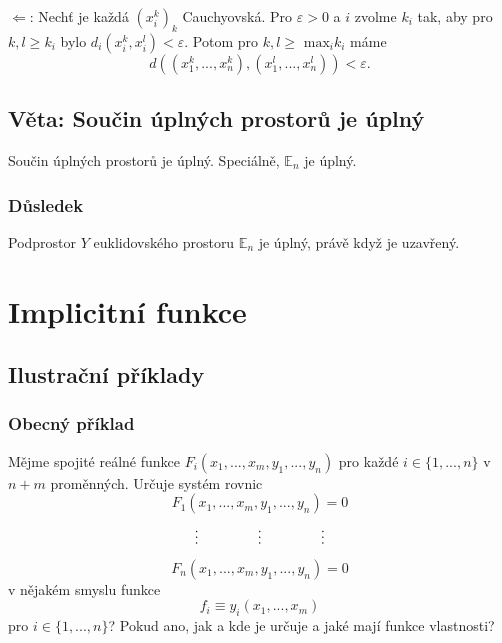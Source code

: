 \documentclass[10pt]{article}
\begin{document}
$\Leftarrow$: Nechť je každá $(x_i^k)_k$ Cauchyovská. Pro $\varepsilon > 0$ a $i$ zvolme $k_i$ tak,
aby pro $k,l \geq k_i$ bylo $d_i(x_i^k, x_i^l) < \varepsilon.$ Potom pro $k,l \geq$ $\text{max}_i k_i$ máme 
\[d((x_1^k,...,x_n^k),(x_1^l,...,x_n^l)) < \varepsilon.\]

\subsection{Věta: Součin úplných prostorů je úplný }
\hspace{1.2mm}
\noindent
Součin úplných prostorů je úplný. Speciálně, $\mathbb{E}_n$ je úplný.

\subsubsection{Důsledek}
\hspace{1.2mm}
\noindent
Podprostor $Y$ euklidovského prostoru $\mathbb{E}_n$ je úplný, právě když je uzavřený.

\section{Implicitní funkce}
\hspace{1.2mm}
\noindent

\subsection{Ilustrační příklady}

\subsubsection{Obecný příklad}
\noindent
\hspace{1.2mm}
Mějme spojité reálné funkce $F_i(x_1, ... , x_m, y_1, ... , y_n)$ pro každé $i \in \{1, ..., n\}$
v $n + m$
proměnných. Určuje systém rovnic
\[ F_1(x_1, ... , x_m, y_1, ... , y_n) = 0 \]
\[ \vdots \hspace{15mm} \vdots \hspace{15mm} \vdots \]
\[ F_n(x_1, ... , x_m, y_1, ... , y_n) = 0 \]
v nějakém smyslu funkce
\[ f_i \equiv y_i(x_1, ... , x_m) \]
pro $i \in \{ 1, ... , n \}$? Pokud ano, jak a kde je určuje a jaké mají funkce vlastnosti?
\end{document}
